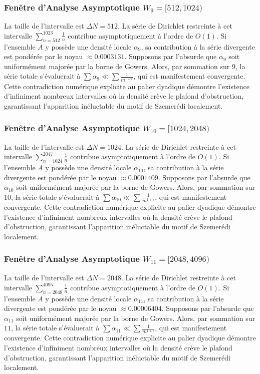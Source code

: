 \documentclass[11pt,a4paper]{article}
\begin{document}
\subsubsection{Fenêtre d'Analyse Asymptotique $W_{9} = [512, 1024)$}
La taille de l'intervalle est $\Delta N = 512$. La série de Dirichlet restreinte à cet intervalle $\sum_{n=512}^{1023} \frac{1}{n}$ contribue asymptotiquement à l'ordre de $O(1)$. Si l'ensemble $A$ y possède une densité locale $\alpha_{9}$, sa contribution à la série divergente est pondérée par le noyau $\approx 0.0003131$. Supposons par l'absurde que $\alpha_{9}$ soit uniformément majorée par la borne de Gowers. Alors, par sommation sur $9$, la série totale s'évaluerait à $\sum \alpha_{9} \ll \sum \frac{1}{m^{1+\epsilon}}$, qui est manifestement convergente. Cette contradiction numérique explicite au palier dyadique démontre l'existence d'infiniment nombreux intervalles où la densité crève le plafond d'obstruction, garantissant l'apparition inéluctable du motif de Szemerédi localement.
\subsubsection{Fenêtre d'Analyse Asymptotique $W_{10} = [1024, 2048)$}
La taille de l'intervalle est $\Delta N = 1024$. La série de Dirichlet restreinte à cet intervalle $\sum_{n=1024}^{2047} \frac{1}{n}$ contribue asymptotiquement à l'ordre de $O(1)$. Si l'ensemble $A$ y possède une densité locale $\alpha_{10}$, sa contribution à la série divergente est pondérée par le noyau $\approx 0.0001409$. Supposons par l'absurde que $\alpha_{10}$ soit uniformément majorée par la borne de Gowers. Alors, par sommation sur $10$, la série totale s'évaluerait à $\sum \alpha_{10} \ll \sum \frac{1}{m^{1+\epsilon}}$, qui est manifestement convergente. Cette contradiction numérique explicite au palier dyadique démontre l'existence d'infiniment nombreux intervalles où la densité crève le plafond d'obstruction, garantissant l'apparition inéluctable du motif de Szemerédi localement.
\subsubsection{Fenêtre d'Analyse Asymptotique $W_{11} = [2048, 4096)$}
La taille de l'intervalle est $\Delta N = 2048$. La série de Dirichlet restreinte à cet intervalle $\sum_{n=2048}^{4095} \frac{1}{n}$ contribue asymptotiquement à l'ordre de $O(1)$. Si l'ensemble $A$ y possède une densité locale $\alpha_{11}$, sa contribution à la série divergente est pondérée par le noyau $\approx 0.00006404$. Supposons par l'absurde que $\alpha_{11}$ soit uniformément majorée par la borne de Gowers. Alors, par sommation sur $11$, la série totale s'évaluerait à $\sum \alpha_{11} \ll \sum \frac{1}{m^{1+\epsilon}}$, qui est manifestement convergente. Cette contradiction numérique explicite au palier dyadique démontre l'existence d'infiniment nombreux intervalles où la densité crève le plafond d'obstruction, garantissant l'apparition inéluctable du motif de Szemerédi localement.
\end{document}
